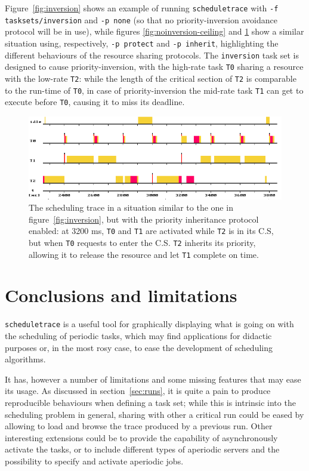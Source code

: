 \documentclass[paper=a4, fontsize=11pt]{scrartcl}
\newcommand{\mono}[1]{\texttt{#1}}
\numberwithin{equation}{section}        %
\numberwithin{figure}{section}          %
\numberwithin{table}{section}               %
\numberwithin{fragment}{section}
\begin{document}
Figure~\ref{fig:inversion} shows an example of running \mono{scheduletrace} with \mono{-f tasksets/inversion} and \mono{-p none} (so that no priority-inversion avoidance protocol will be in use), while figures \ref{fig:noinversion-ceiling} and \ref{fig:noinversion-inherit} show a similar situation using, respectively, \mono{-p protect} and \mono{-p inherit}, highlighting the different behaviours of the resource sharing protocols. The \mono{inversion} task set is designed to cause priority-inversion, with the high-rate task \mono{T0} sharing a resource with the low-rate \mono{T2}: while the length of the critical section of \mono{T2} is comparable to the run-time of \mono{T0}, in case of priority-inversion the mid-rate task \mono{T1} can get to execute before \mono{T0}, causing it to miss its deadline.

\begin{figure}
  \centering
  \includegraphics[width=1\textwidth]{img/noinversion_inherit.png}
  \caption{\label{fig:noinversion-inherit} The scheduling trace in a situation similar to the one in figure~\ref{fig:inversion}, but with the priority inheritance protocol enabled: at 3200 ms, \mono{T0} and \mono{T1} are activated while \mono{T2} is in its C.S, but when \mono{T0} requests to enter the C.S. \mono{T2} inherits its priority, allowing it to release the resource and let \mono{T1} complete on time.}
\end{figure}


\section{Conclusions and limitations}
\mono{scheduletrace} is a useful tool for graphically displaying what is going on with the scheduling of periodic tasks, which may find applications for didactic purposes or, in the most rosy case, to ease the development of scheduling algorithms.

It has, however a number of limitations and some missing features that may ease its usage. As discussed in section~\ref{sec:runs}, it is quite a pain to produce reproducible behaviours when defining a task set; while this is intrinsic into the scheduling problem in general, sharing with other a critical run could be eased by allowing to load and browse the trace produced by a previous run. Other interesting extensions could be to provide the capability of asynchronously activate the tasks, or to include different types of aperiodic servers and the possibility to specify and activate aperiodic jobs.
\end{document}
